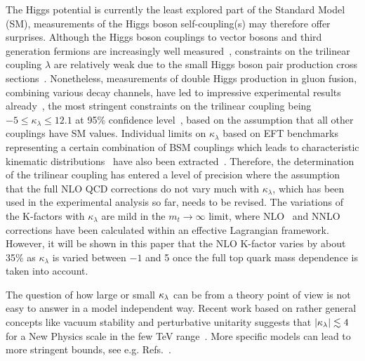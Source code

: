 The Higgs potential is currently the least explored part of the Standard Model (SM), measurements of the Higgs boson self-coupling(s) may therefore offer surprises.
Although the Higgs boson couplings to vector bosons and third generation fermions are increasingly well measured~\cite{Khachatryan:2016vau,Aaboud:2017vzb,ATLAS:2018doi,Sirunyan:2018koj,Sirunyan:2018sgc}, constraints on the trilinear coupling $\lambda$ are relatively weak due to the small Higgs boson pair production cross sections~\cite{Baglio:2012np,Frederix:2014hta}.  
Nonetheless, measurements of double Higgs production in gluon fusion, combining various decay channels,  have led to impressive experimental results already~\cite{Sirunyan:2018two,Sirunyan:2018iwt,ATLAS-CONF-2018-043,Aaboud:2018ftw}, 
the most stringent constraints on the trilinear coupling being $-5\leq \kappa_\lambda\leq 12.1$
 at 95\% confidence level~\cite{ATLAS-CONF-2018-043}, based on the assumption that all other couplings have SM values.
Individual limits on $\kappa_\lambda$ based on EFT benchmarks representing a certain combination of BSM couplings which leads to characteristic kinematic distributions~\cite{Carvalho:2015ttv,Carvalho:2016rys,Buchalla:2018yce} have also been extracted~\cite{Sirunyan:2018two,Sirunyan:2018iwt}.
Therefore, the determination of the trilinear coupling has entered a level of precision where the assumption that the full NLO QCD corrections do not vary much with $\kappa_\lambda$, which has been used in the experimental analysis so far, needs to be revised.
The variations of the K-factors with $\kappa_\lambda$ are mild in the $m_t\to \infty$ limit, where NLO~\cite{Grober:2015cwa,Grober:2017gut} and NNLO~\cite{deFlorian:2017qfk} corrections have been calculated within an effective Lagrangian framework.
However, it will be shown in this paper that the NLO K-factor varies by about 35\% as $\kappa_\lambda$ is varied between $-1$ and 5 once the full top quark mass dependence is taken into account. 

The question of how large or small $\kappa_{\lambda}$ can be from a theory point of view is not easy to answer in a model independent way. 
Recent work based on rather general concepts like vacuum stability and perturbative unitarity suggests that $|\kappa_{\lambda}|\lesssim 4$ for a New Physics scale in the few TeV range~\cite{Falkowski:2019tft,Chang:2019vez,DiLuzio:2017tfn,DiVita:2017eyz}.
More specific models can lead to more stringent bounds, see e.g. Refs.~\cite{Braathen:2019pxr,Basler:2018dac,Babu:2018uik,Lewis:2017dme}.

\medskip

